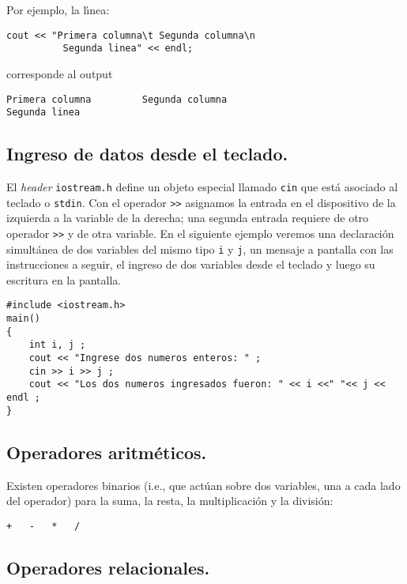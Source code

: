\vspace{.3cm}
Por ejemplo, la l{\'\i}nea:

\begin{verbatim}
cout << "Primera columna\t Segunda columna\n 
          Segunda linea" << endl;
\end{verbatim}
corresponde al output

\begin{verbatim}
Primera columna         Segunda columna
Segunda linea
\end{verbatim}



\subsection{Ingreso de datos desde el teclado.}

El {\it header} \verb+iostream.h+ define un objeto especial llamado
\verb+cin+ que est\'a asociado al teclado o \verb+stdin+. Con el
operador \verb+>>+ asignamos la entrada en el dispositivo de la
izquierda a la variable de la derecha; una segunda entrada requiere de otro
operador \verb+>>+ y de otra variable. En el siguiente ejemplo veremos
una declaraci{\'o}n simult{\'a}nea de dos variables del mismo tipo \verb+i+ y
\verb+j+, un mensaje a pantalla con las instrucciones a seguir, el
ingreso de dos variables desde el teclado y luego su escritura en la pantalla.
\begin{verbatim}
#include <iostream.h>
main()
{
    int i, j ;
    cout << "Ingrese dos numeros enteros: " ;
    cin >> i >> j ;
    cout << "Los dos numeros ingresados fueron: " << i <<" "<< j << endl ;
}
\end{verbatim}

\subsection{Operadores aritm{\'e}ticos.}

Existen operadores binarios (i.e., que act\'uan sobre dos variables,
una a cada lado del operador) para la suma, la resta, la multiplicaci{\'o}n
y la
divisi{\'o}n:

\begin{verbatim}
+   -   *   /  
\end{verbatim}

\subsection{Operadores relacionales.}

